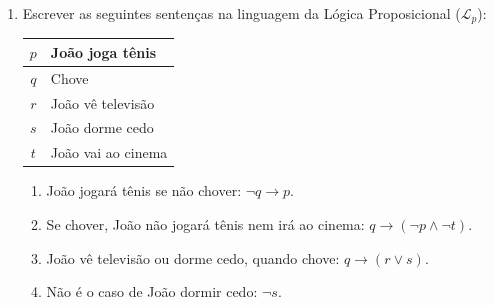 \begin{enumerate}[label=\arabic*., left=0.5cm, align=left, nosep]
\begin{enumerate}[label=(\alph*), left=0.5cm, align=left, nosep]
                    \item Minha irmã quer um gato preto e branco.
                    \begin{center}
                        $p$ : Minha irmã quer um gato preto \\
                        $q$ : Minha irmã quer um gato branco \\
                        $p \land q$
                    \end{center}

                \end{enumerate}    
                
            \item Escrever as seguintes sentenças na linguagem da Lógica Proposicional ($\mathcal{L}_p$):
                
                    \begin{center}
                        \begin{tabular}{|c|l|}
                            \hline
                            $p$ & João joga tênis \\
                            \hline
                            $q$ & Chove \\
                            \hline
                            $r$ & João vê televisão \\
                            \hline
                            $s$ & João dorme cedo \\
                            \hline
                            $t$ & João vai ao cinema \\
                            \hline
                        \end{tabular}
                    \end{center}

                \begin{enumerate}[label=(\alph*), left=0.5cm, align=left, nosep]
                    \item João jogará tênis se não chover: $\neg q \rightarrow p$.
                    \item Se chover, João não jogará tênis nem irá ao cinema: $q \rightarrow (\neg p \land \neg t)$.
                    \item João vê televisão ou dorme cedo, quando chove: $q \rightarrow (r \lor s)$.  
                    \item Não é o caso de João dormir cedo: $\neg s$.                
                \end{enumerate} 
            

\end{enumerate}
